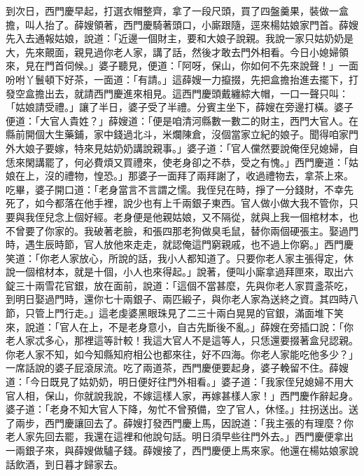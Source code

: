到次日，西門慶早起，打選衣帽整齊，拿了一段尺頭，買了四盤羹果，裝做一盒擔，叫人抬了。薛嫂領著，西門慶騎著頭口，小廝跟隨，逕來楊姑娘家門首。薛嫂先入去通報姑娘，說道：「近邊一個財主，要和大娘子說親。我說一家只姑奶奶是大，先來覿面，親見過你老人家，講了話，然後才敢去門外相看。今日小媳婦領來，見在門首伺候。」婆子聽見，便道：「阿呀，保山，你如何不先來說聲！」一面吩咐丫鬟頓下好茶，一面道：「有請。」這薛嫂一力攛掇，先把盒擔抬進去擺下，打發空盒擔出去，就請西門慶進來相見。這西門慶頭戴纏綜大帽，一口一聲只叫：「姑娘請受禮。」讓了半日，婆子受了半禮。分賓主坐下，薛嫂在旁邊打橫。婆子便道：「大官人貴姓？」薛嫂道：「便是咱清河縣數一數二的財主，西門大官人。在縣前開個大生藥鋪，家中錢過北斗，米爛陳倉，沒個當家立紀的娘子。聞得咱家門外大娘子要嫁，特來見姑奶奶講說親事。」婆子道：「官人儻然要說俺侄兒媳婦，自恁來閑講罷了，何必費煩又買禮來，使老身卻之不恭，受之有愧。」西門慶道：「姑娘在上，沒的禮物，惶恐。」那婆子一面拜了兩拜謝了，收過禮物去，拿茶上來。吃畢，婆子開口道：「老身當言不言謂之懦。我侄兒在時，掙了一分錢財，不幸先死了，如今都落在他手裡，說少也有上千兩銀子東西。官人做小做大我不管你，只要與我侄兒念上個好經。老身便是他親姑娘，又不隔從，就與上我一個棺材本，也不曾要了你家的。我破著老臉，和張四那老狗做臭毛鼠，替你兩個硬張主。娶過門時，遇生辰時節，官人放他來走走，就認俺這門窮親戚，也不過上你窮。」西門慶笑道：「你老人家放心，所說的話，我小人都知道了。只要你老人家主張得定，休說一個棺材本，就是十個，小人也來得起。」說著，便叫小廝拿過拜匣來，取出六錠三十兩雪花官銀，放在面前，說道：「這個不當甚麼，先與你老人家買盞茶吃，到明日娶過門時，還你七十兩銀子、兩匹緞子，與你老人家為送終之資。其四時八節，只管上門行走。」這老虔婆黑眼珠見了二三十兩白晃晃的官銀，滿面堆下笑來，說道：「官人在上，不是老身意小，自古先斷後不亂。」薛嫂在旁插口說：「你老人家忒多心，那裡這等計較！我這大官人不是這等人，只恁還要掇著盒兒認親。你老人家不知，如今知縣知府相公也都來往，好不四海。你老人家能吃他多少？」一席話說的婆子屁滾尿流。吃了兩道茶，西門慶便要起身，婆子輓留不住。薛嫂道：「今日既見了姑奶奶，明日便好往門外相看。」婆子道：「我家侄兒媳婦不用大官人相，保山，你就說我說，不嫁這樣人家，再嫁甚樣人家！」西門慶作辭起身。婆子道：「老身不知大官人下降，匆忙不曾預備，空了官人，休怪。」拄拐送出。送了兩步，西門慶讓回去了。薛嫂打發西門慶上馬，因說道：「我主張的有理麼？你老人家先回去罷，我還在這裡和他說句話。明日須早些往門外去。」西門慶便拿出一兩銀子來，與薛嫂做驢子錢。薛嫂接了，西門慶便上馬來家。他還在楊姑娘家說話飲酒，到日暮才歸家去。

